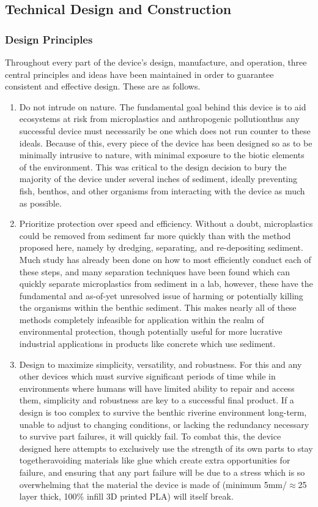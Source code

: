 \documentclass[fleqn,10pt]{SelfArx} %
\begin{document}
	\subsection{Technical Design and Construction}
	\label{subsec:TechDesign}
	\subsubsection{Design Principles}
	
		Throughout every part of the device’s design, manufacture, and operation, three central principles and ideas have been maintained in order to guarantee consistent and effective design. These are as follows.
	\begin{enumerate}
		\item Do not intrude on nature.
		\subitem The fundamental goal behind this device is to aid ecosystems at risk from microplastics and anthropogenic pollution\textemdash thus any successful device must necessarily be one which does not run counter to these ideals. Because of this, every piece of the device has been designed so as to be minimally intrusive to nature, with minimal exposure to the biotic elements of the environment. This was critical to the design decision to bury the majority of the device under several inches of sediment, ideally preventing fish, benthos, and other organisms from interacting with the device as much as possible.
		\item Prioritize protection over speed and efficiency.
		\subitem Without a doubt, microplastics could be removed from sediment far more quickly than with the method proposed here, namely by dredging, separating, and re-depositing sediment. Much study has already been done on how to most efficiently conduct each of these steps, and many separation techniques have been found which can quickly separate microplastics from sediment in a lab, however, these have the fundamental and as-of-yet unresolved issue of harming or potentially killing the organisms within the benthic sediment. This makes nearly all of these methods completely infeasible for application within the realm of environmental protection, though potentially useful for more lucrative industrial applications in products like concrete which use sediment. 
		\item Design to maximize simplicity, versatility, and robustness.
		\subitem For this and any other devices which must survive significant periods of time while in environments where humans will have limited ability to repair and access them, simplicity and robustness are key to a successful final product. If a design is too complex to survive the benthic riverine environment long-term, unable to adjust to changing conditions, or lacking the redundancy necessary to survive part failures, it will quickly fail. To combat this, the device designed here attempts to exclusively use the strength of its own parts to stay together\textemdash avoiding materials like glue which create extra opportunities for failure, and ensuring that any part failure will be due to a stress which is so overwhelming that the material the device is made of (minimum 5mm/$\approx$25 layer thick, 100\% infill 3D printed PLA) will itself break. 
		

\end{enumerate}
\end{document}
